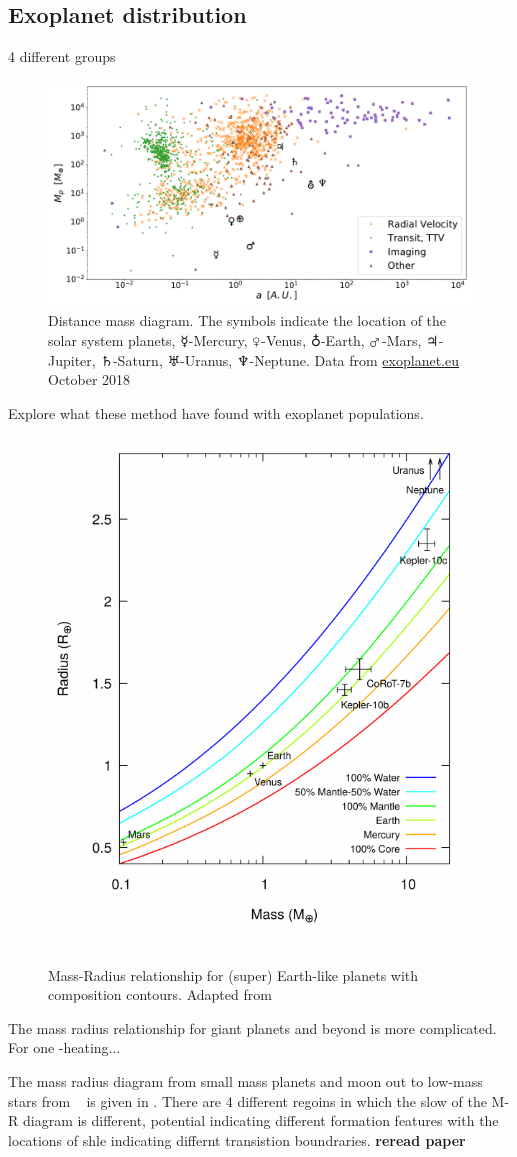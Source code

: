 \subsection{Exoplanet distribution} 4 different groups


\begin{figure}
    \centering
    \includegraphics[width=0.\linewidth]{./figures/introduction/exoplanetEU_a_mass.pdf}
    \caption{Distance mass diagram.
        The symbols indicate the location of the solar system planets, $\mercury$-Mercury, $\venus$-Venus, $\earth$-Earth, $\mars$-Mars, $\jupiter$-Jupiter, $\saturn$-Saturn, $\uranus$-Uranus, $\neptune$-Neptune.
        Data from \href{http://ww.exoplanet.eu}{exoplanet.eu} October 2018}
    \label{fig:pltoverlayadd}
\end{figure}


Explore what these method have found with exoplanet populations.


\begin{figure}[t]
    \centering
    \includegraphics[width=0.4\linewidth]{./figures/introduction/Mass_radius_relation-compostion_Brugger_2017.pdf}\\
    \caption{Mass-Radius relationship for (super) Earth-like planets with composition contours.
        Adapted from~\citet{brugger_constraints_2017}}
    \label{fig:mass_radius_relation_composition}
\end{figure}


The mass radius relationship for giant planets and beyond is more complicated. For one -heating...

The mass radius diagram from small mass planets and moon out to low-mass stars from ~\citet{chen_probabilistic_2016} is given in .
There are 4 different regoins in which the slow of the M-R diagram is different, potential indicating different formation features with the locations of shle indicating differnt transistion boundraries. \textbf{reread paper} 

